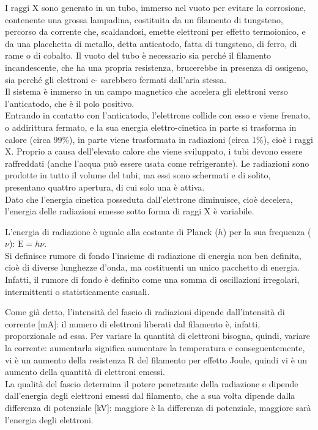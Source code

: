 I raggi X sono generato in un tubo, immerso nel vuoto per evitare la corrosione, contenente una grossa lampadina, costituita da un filamento di tungsteno, percorso da corrente che, scaldandosi, emette elettroni per effetto termoionico, e da una placchetta di metallo, detta anticatodo, fatta di tungsteno, di ferro, di rame o di cobalto. Il vuoto del tubo è necessario sia perché il filamento incandescente, che ha una propria resistenza, brucerebbe in presenza di ossigeno, sia perché gli elettroni e- sarebbero fermati dall’aria stessa.\\
Il sistema è immerso in un campo magnetico che accelera gli elettroni verso l’anticatodo, che è il polo positivo.\\
Entrando in contatto con l’anticatodo, l’elettrone collide con esso e viene frenato, o addirittura fermato, e la sua energia elettro-cinetica in parte si trasforma in calore (circa 99\%), in parte viene trasformata in radiazioni (circa 1\%), cioè i raggi X. Proprio a causa dell’elevato calore che viene sviluppato, i tubi devono essere raffreddati (anche l’acqua può essere usata come refrigerante). Le radiazioni sono prodotte in tutto il volume del tubi, ma essi sono schermati e di solito, presentano quattro apertura, di cui solo una è attiva.\\
Dato che l’energia cinetica posseduta dall’elettrone diminuisce, cioè decelera, l’energia delle radiazioni emesse sotto forma di raggi X è variabile.

L'energia di radiazione è uguale alla costante di Planck ($h$) per la sua frequenza ($\nu$): $\mathrm{E}=h\nu$.\\
Si definisce rumore di fondo l’insieme di radiazione di energia non ben definita, cioè di diverse lunghezze d’onda, ma costituenti un unico pacchetto di energia. Infatti, il rumore di fondo è definito come una somma di oscillazioni irregolari, intermittenti o statisticamente casuali.


Come già detto, l’intensità del fascio di radiazioni dipende dall’intensità di corrente [mA]: il numero di elettroni liberati dal filamento è, infatti, proporzionale ad essa. Per variare la quantità di elettroni bisogna, quindi, variare la corrente: aumentarla significa aumentare la temperatura e conseguentemente, vi è un aumento della resistenza R del filamento per effetto Joule, quindi vi è un aumento della quantità di elettroni emessi.\\
La qualità del fascio determina il potere penetrante della radiazione e dipende dall’energia degli elettroni emessi dal filamento, che a sua volta dipende dalla differenza di potenziale [kV]: maggiore è la differenza di potenziale, maggiore sarà l’energia degli elettroni.

